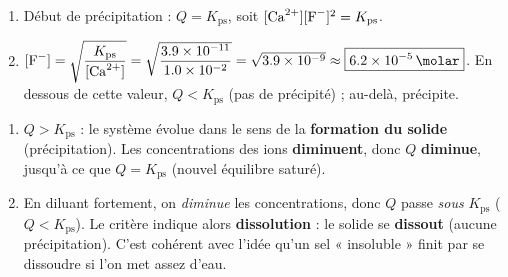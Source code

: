 \documentclass[11pt,a4paper]{article}
\newcommand{\Kps}{K_{\mathrm{ps}}}
\begin{document}
\begin{correction}
\begin{enumerate}[label=\alph*),leftmargin=2em,topsep=2pt,itemsep=2pt]
  \item Début de précipitation : $Q=\Kps$, soit $[\ce{Ca^2+}][\ce{F-}]^{2}=\Kps$.
  \item $[\ce{F-}]=\sqrt{\dfrac{\Kps}{[\ce{Ca^2+}]}}=\sqrt{\dfrac{\num{3{,}9e-11}}{\num{1{,}0e-2}}}
        =\sqrt{\num{3{,}9e-9}}\approx\boxed{\qty{6{,}2e-5}{\molar}}$.
        En dessous de cette valeur, $Q<\Kps$ (pas de précipité) ; au-delà,  précipite.
\end{enumerate}
\end{correction}

\begin{correction}
\begin{enumerate}[label=\alph*),leftmargin=2em,topsep=2pt,itemsep=2pt]
  \item $Q>\Kps$ : le système évolue dans le sens de la \textbf{formation du solide} (précipitation).
        Les concentrations des ions \textbf{diminuent}, donc $Q$ \textbf{diminue}, jusqu'à ce que
        $Q=\Kps$ (nouvel équilibre saturé).
  \item En diluant fortement, on \emph{diminue} les concentrations, donc $Q$ passe \emph{sous} $\Kps$
        ($Q<\Kps$). Le critère indique alors \textbf{dissolution} : le solide se \textbf{dissout}
        (aucune précipitation). C'est cohérent avec l'idée qu'un sel « insoluble » finit par se
        dissoudre si l'on met assez d'eau.
\end{enumerate}
\end{correction}
\end{document}
